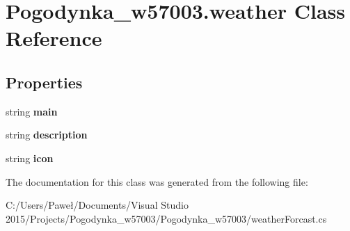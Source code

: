 \hypertarget{class_pogodynka__w57003_1_1weather}{}\section{Pogodynka\+\_\+w57003.\+weather Class Reference}
\label{class_pogodynka__w57003_1_1weather}
\subsection*{Properties}
\begin{DoxyCompactItemize}
\item 
\mbox{\label{class_pogodynka__w57003_1_1weather_ae2f706e831883a287c6b981b6d1f6f8d}} 
string {\bfseries main}
\item 
\mbox{\label{class_pogodynka__w57003_1_1weather_a255f65b78a033aef4fe167c578147b85}} 
string {\bfseries description}
\item 
\mbox{\label{class_pogodynka__w57003_1_1weather_aeede86305665ee36d43a64e0d28c1c65}} 
string {\bfseries icon}
\end{DoxyCompactItemize}


The documentation for this class was generated from the following file\+:\begin{DoxyCompactItemize}
\item 
C\+:/\+Users/\+Paweł/\+Documents/\+Visual Studio 2015/\+Projects/\+Pogodynka\+\_\+w57003/\+Pogodynka\+\_\+w57003/weather\+Forcast.\+cs\end{DoxyCompactItemize}
